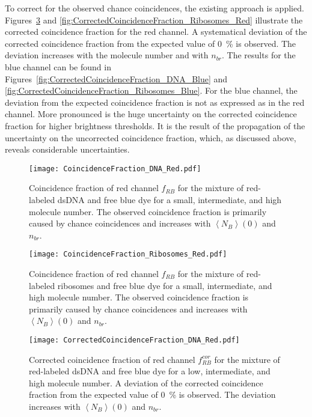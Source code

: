 To correct for the observed chance coincidences, the existing approach is applied. Figures~\ref{fig:CorrectedCoincidenceFraction_DNA_Red} and \ref{fig:CorrectedCoincidenceFraction_Ribosomes_Red} illustrate the corrected coincidence fraction for the red channel. A systematical deviation of the corrected coincidence fraction from the expected value of \SI{0}{\percent} is observed. The deviation increases with the molecule number and with $n_{br}$. The results for the blue channel can be found in Figures~\ref{fig:CorrectedCoincidenceFraction_DNA_Blue} and \ref{fig:CorrectedCoincidenceFraction_Ribosomes_Blue}. For the blue channel, the deviation from the expected coincidence fraction is not as expressed as in the red channel. More pronounced is the huge uncertainty on the corrected coincidence fraction for higher brightness thresholds. It is the result of the propagation of the uncertainty on the uncorrected coincidence fraction, which, as discussed above, reveals considerable uncertainties.

\begin{figure}[h!]
	\centering
	\texttt{[image: CoincidenceFraction\_DNA\_Red.pdf]}
	\caption[Coincidence fraction of red channel for mixture of red-labeled \gls{dsDNA} and free blue dye]{Coincidence fraction of red channel $f_{RB}$ for the mixture of red-labeled \gls{dsDNA} and free blue dye for a small, intermediate, and high molecule number. The observed coincidence fraction is primarily caused by chance coincidences and increases with $\left\langle N_B \right\rangle (0)$ and $n_{br}$.}
	\label{fig:CoincidenceFraction_DNA_Red}
\end{figure}

\vfill
\begin{figure}[h!]
	\centering
	\texttt{[image: CoincidenceFraction\_Ribosomes\_Red.pdf]}
	\caption[Coincidence fraction of red channel for mixture of red-labeled ribosomes and free blue dye]{Coincidence fraction of red channel $f_{RB}$ for the mixture of red-labeled ribosomes and free blue dye for a small, intermediate, and high molecule number. The observed coincidence fraction is primarily caused by chance coincidences and increases with $\left\langle N_B \right\rangle (0)$ and $n_{br}$.}
	\label{fig:CoincidenceFraction_Ribosomes_Red}
\end{figure}
\vfill

\vfill
\begin{figure}[h!]
	\centering
	\texttt{[image: CorrectedCoincidenceFraction\_DNA\_Red.pdf]}
	\caption[Corrected coincidence fraction of red channel for mixture of red-labeled \gls{dsDNA} and free blue dye]{Corrected coincidence fraction of red channel $f_{RB}^{cor}$ for the mixture of red-labeled \gls{dsDNA} and free blue dye for a low, intermediate, and high molecule number. A deviation of the corrected coincidence fraction from the expected value of \SI{0}{\percent} is observed. The deviation increases with $\left\langle N_B \right\rangle (0)$ and $n_{br}$.}
	\label{fig:CorrectedCoincidenceFraction_DNA_Red}
\end{figure}
\vfill

